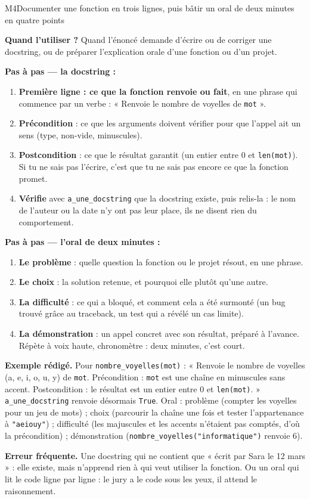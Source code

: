 \begin{fichemethode}{M4}{Documenter une fonction en trois lignes, puis bâtir un oral de deux minutes en quatre points}

\textbf{Quand l'utiliser ?} Quand l'énoncé demande d'écrire ou de corriger une docstring, ou
de préparer l'explication orale d'une fonction ou d'un projet.

\textbf{Pas à pas --- la docstring :}
\begin{enumerate}
  \item \textbf{Première ligne : ce que la fonction renvoie ou fait}, en une phrase qui
        commence par un verbe : « Renvoie le nombre de voyelles de \lstinline{mot} ».
  \item \textbf{Précondition} : ce que les arguments doivent vérifier pour que l'appel ait un
        sens (type, non-vide, minuscules).
  \item \textbf{Postcondition} : ce que le résultat garantit (un entier entre $0$ et
        \lstinline{len(mot)}). Si tu ne sais pas l'écrire, c'est que tu ne sais pas encore
        ce que la fonction promet.
  \item \textbf{Vérifie} avec \lstinline{a_une_docstring} que la docstring existe, puis
        relis-la : le nom de l'auteur ou la date n'y ont pas leur place, ils ne disent rien
        du comportement.
\end{enumerate}

\textbf{Pas à pas --- l'oral de deux minutes :}
\begin{enumerate}
  \item \textbf{Le problème} : quelle question la fonction ou le projet résout, en une
        phrase.
  \item \textbf{Le choix} : la solution retenue, et pourquoi elle plutôt qu'une autre.
  \item \textbf{La difficulté} : ce qui a bloqué, et comment cela a été surmonté (un bug
        trouvé grâce au traceback, un test qui a révélé un cas limite).
  \item \textbf{La démonstration} : un appel concret avec son résultat, préparé à l'avance.
        Répète à voix haute, chronomètre : deux minutes, c'est court.
\end{enumerate}

\textbf{Exemple rédigé.} Pour \lstinline{nombre_voyelles(mot)} : « Renvoie le nombre de
voyelles (a, e, i, o, u, y) de \lstinline{mot}. Précondition : \lstinline{mot} est une chaîne
en minuscules sans accent. Postcondition : le résultat est un entier entre $0$ et
\lstinline{len(mot)}. » \lstinline{a_une_docstring} renvoie désormais \lstinline{True}. Oral :
problème (compter les voyelles pour un jeu de mots) ; choix (parcourir la chaîne une fois et
tester l'appartenance à \lstinline{"aeiouy"}) ; difficulté (les majuscules et les accents
n'étaient pas comptés, d'où la précondition) ; démonstration
(\lstinline{nombre_voyelles("informatique")} renvoie $6$).

\textbf{Erreur fréquente.} Une docstring qui ne contient que « écrit par Sara le 12 mars » :
elle existe, mais n'apprend rien à qui veut utiliser la fonction. Ou un oral qui lit le code
ligne par ligne : le jury a le code sous les yeux, il attend le raisonnement.

\end{fichemethode}
